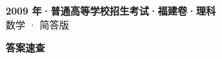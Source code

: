 \documentclass[zihao=-4, a4paper]{ctexart}
\begin{document}
\begin{center}
  {\Large\bfseries 2009 年·普通高等学校招生考试·福建卷·理科}\\[4pt]
  {\large 数学 · 简答版}
\end{center}
\medskip
{}

\clearpage
{}
\begin{center}{\Large\bfseries 答案速查}\end{center}
\medskip

\end{document}
